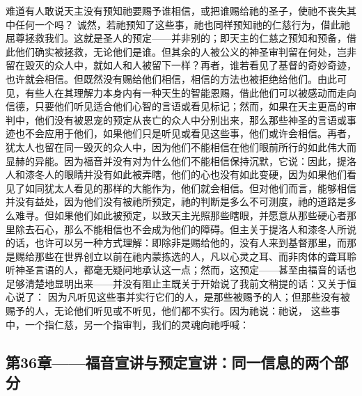 难道有人敢说天主没有预知祂要赐予谁相信，或把谁赐给祂的圣子，使祂不丧失其中任何一个吗？ 诚然，若祂预知了这些事，祂也同样预知祂的仁慈行为，借此祂屈尊拯救我们。这就是圣人的预定——并非别的；即天主的仁慈之预知和预备，借此他们确实被拯救，无论他们是谁。但其余的人被公义的神圣审判留在何处，岂非留在毁灭的众人中，就如人和人被留下一样？再者，谁若看见了基督的奇妙奇迹，也许就会相信。但既然没有赐给他们相信，相信的方法也被拒绝给他们。由此可见，有些人在其理解力本身内有一种天生的智能恩赐，借此他们可以被感动而走向信德，只要他们听见适合他们心智的言语或看见标记；然而，如果在天主更高的审判中，他们没有被恩宠的预定从丧亡的众人中分别出来，那么那些神圣的言语或事迹也不会应用于他们，如果他们只是听见或看见这些事，他们或许会相信。再者，犹太人也留在同一毁灭的众人中，因为他们不能相信在他们眼前所行的如此伟大而显赫的异能。因为福音并没有对为什么他们不能相信保持沉默，它说：因此，提洛人和漆冬人的眼睛并没有如此被弄瞎，他们的心也没有如此变硬，因为如果他们看见了如同犹太人看见的那样的大能作为，他们就会相信。但对他们而言，能够相信并没有益处，因为他们没有被祂所预定，祂的判断是多么不可测度，祂的道路是多么难寻。但如果他们如此被预定，以致天主光照那些瞎眼，并愿意从那些硬心者那里除去石心，那么不能相信也不会成为他们的障碍。但主关于提洛人和漆冬人所说的话，也许可以另一种方式理解：即除非是赐给他的，没有人来到基督那里，而那是赐给那些在世界创立以前在祂内蒙拣选的人，凡以心灵之耳、而非肉体的聋耳聆听神圣言语的人，都毫无疑问地承认这一点；然而，这预定——甚至由福音的话也足够清楚地显明出来——并没有阻止主既关于开始说了我前文稍提的话：又关于恒心说了： 因为凡听见这些事并实行它们的人，是那些被赐予的人；但那些没有被赐予的人，无论他们听见或不听见，他们都不实行。因为祂说：祂说， 这些事中，一个指仁慈，另一个指审判，我们的灵魂向祂呼喊：\par


\subsection{第36章——福音宣讲与预定宣讲：同一信息的两个部分}

